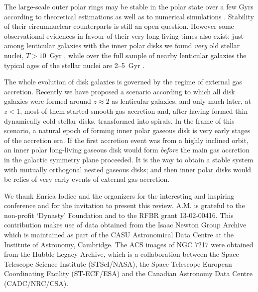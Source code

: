 \documentclass[11pt,twoside]{article}
\begin{document}
The large-scale outer polar rings may be stable in the polar state over a few Gyrs  
according to theoretical estimations \citep[e.g.][]{steiman-cameron} as well as to numerical 
simulations \citep{Snaith2012}. Stability of their circumnuclear counterparts is still an open 
question. However some observational evidences in favour of their very long living times also exist: 
just among lenticular galaxies with the inner polar disks we found {\it very} old stellar nuclei, 
$T>10$~Gyr \citep{polardust}, while over the full sample of nearby lenticular galaxies 
the typical ages of the stellar nuclei are 2--5~Gyr \citep{sil06,sil08}. 

The whole evolution of disk galaxies is governed by the regime of external gas accretion.
Recently we \citep{sil12} have proposed a scenario according to which all disk galaxies were
formed around $z\approx 2$ as lenticular galaxies, and only much later, at $z<1$, most of
them started smooth gas accretion and, after having formed thin dynamically cold stellar disks,
transformed into spirals. In the frame of this scenario, a natural epoch of forming
inner polar gaseous disk is very early stages of the accretion era. If the first accretion
event was from a highly inclined orbit, an inner polar long-living gaseous disk would
form {\it before} the main gas accretion in the galactic symmetry plane proceeded.
It is the way to obtain a stable system with mutually orthogonal nested gaseous disks;
and then inner polar disks would be relics of very early events of external gas accretion.


\acknowledgements We thank Enrica Iodice and the organizers for the interesting and inspiring 
conference and for the invitation to present this review. A.M. is  grateful to the non-profit 
`Dynasty' Foundation and to the RFBR grant 13-02-00416. This contribution makes use of data obtained 
from the Isaac Newton Group Archive which is maintained as part of the CASU Astronomical
Data Centre at the Institute of Astronomy, Cambridge. The ACS images of NGC 7217  were obtained  
from the Hubble Legacy Archive, which is a collaboration between the Space Telescope Science Institute 
(STScI/NASA), the Space Telescope European Coordinating Facility (ST-ECF/ESA) and the Canadian Astronomy 
Data Centre (CADC/NRC/CSA).



\end{document}
